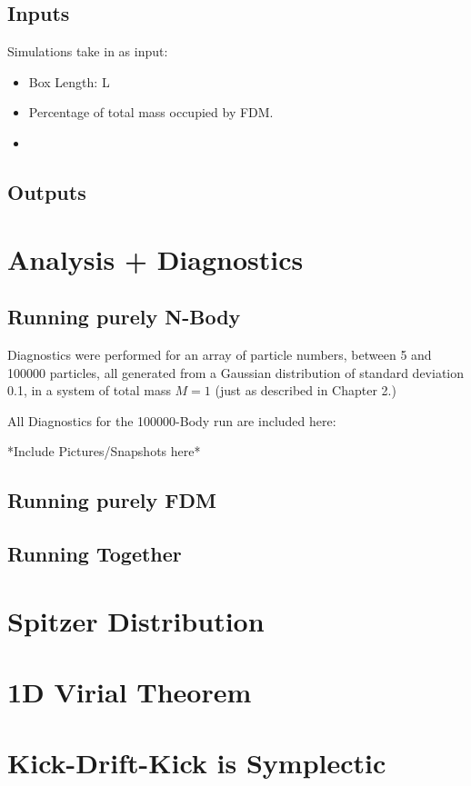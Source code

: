 \documentclass[oneside]{book}
\begin{document}
\section{Inputs}

Simulations take in as input:
\begin{itemize}
    \item Box Length: L
    \item Percentage of total mass occupied by FDM.
    \item     
\end{itemize}

\section{Outputs}

\chapter{Analysis + Diagnostics}

\section{Running purely N-Body}
Diagnostics were performed for an array of particle numbers, between 5 and 100000 particles, all generated from a Gaussian distribution of standard deviation 0.1, in a system of total mass $M=1$ (just as described in Chapter 2.)

All Diagnostics for the 100000-Body run are included here:

*Include Pictures/Snapshots here*

\section{Running purely FDM}

\section{Running Together}



\appendix
\chapter{Spitzer Distribution}\label{Spitzer+BinneyTremaineProblem}

\chapter{1D Virial Theorem}

\chapter{Kick-Drift-Kick is Symplectic}\label{KDK Symplectic}


\end{document}
